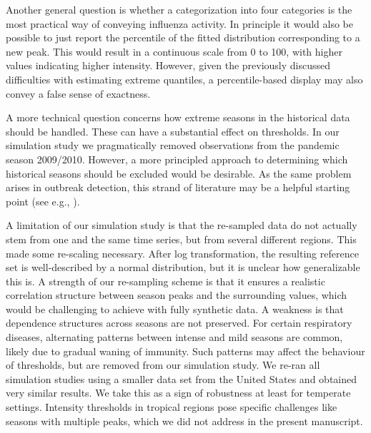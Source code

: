 \documentclass{article}
\begin{document}
Another general question is whether a categorization into four categories is the most practical way of conveying influenza activity. In principle it would also be possible to just report the percentile of the fitted distribution corresponding to a new peak. This would result in a continuous scale from 0 to 100, with higher values indicating higher intensity. However, given the previously discussed difficulties with estimating extreme quantiles, a percentile-based display may also convey a false sense of exactness.

A more technical question concerns how extreme seasons in the historical data should be handled. These can have a substantial effect on thresholds. In our simulation study we pragmatically removed observations from the pandemic season 2009/2010. However, a more principled approach to determining which historical seasons should be excluded would be desirable. As the same problem arises in outbreak detection, this strand of literature may be a helpful starting point (see e.g., \citealt{Noufaily2013}).



A limitation of our simulation study is that the re-sampled data do not actually stem from one and the same time series, but from several different regions. This made some re-scaling necessary. After log transformation, the resulting reference set is well-described by a normal distribution, but it is unclear how generalizable this is. A strength of our re-sampling scheme is that it ensures a realistic correlation structure between season peaks and the surrounding values, which would be challenging to achieve with fully synthetic data. A weakness is that dependence structures across seasons are not preserved. For certain respiratory diseases, alternating patterns between intense and mild seasons are common, likely due to gradual waning of immunity. Such patterns may affect the behaviour of thresholds, but are removed from our simulation study. We re-ran all simulation studies using a smaller data set from the United States and obtained very similar results. We take this as a sign of robustness at least for temperate settings. Intensity thresholds in tropical regions pose specific challenges like seasons with multiple peaks, which we did not address in the present manuscript.



\end{document}
